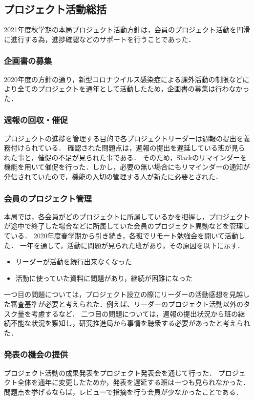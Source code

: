 \subsection*{プロジェクト活動総括}


2021年度秋学期の本局プロジェクト活動方針は，会員のプロジェクト活動を円滑に進行する為，進捗確認などのサポートを行うことであった．

\subsubsection*{企画書の募集}

2020年度の方針の通り，新型コロナウイルス感染症による課外活動の制限などにより全てのプロジェクトを通年として活動したため，企画書の募集は行わなかった．

\subsubsection*{週報の回収・催促}

プロジェクトの進捗を管理する目的で各プロジェクトリーダーは週報の提出を義務付けられている．
確認された問題点は，週報の提出を遅延している班が見られた事と，催促の不足が見られた事である．
そのため，Slackのリマインダーを機能を用いて催促を行った．しかし，必要の無い場合にもリマインダーの通知が発信されていたので，機能の入切の管理する人が新たに必要とされた．

\subsubsection*{会員のプロジェクト管理}

本局では，各会員がどのプロジェクトに所属しているかを把握し，プロジェクトが途中で終了した場合などに所属していた会員のプロジェクト異動などを管理している．
2020年度春学期から引き続き，各班でリモート勉強会を開いて活動した．
一年を通して，活動に問題が見られた班があり，その原因を以下に示す．
\begin{itemize}
\item リーダーが活動を続行出来なくなった
\item 活動に使っていた資料に問題があり，継続が困難になった
\end{itemize}
一つ目の問題については，プロジェクト設立の際にリーダーの活動感想を見越した審査基準が必要と考えられた．例えば、リーダーのプロジェクト活動以外のタスク量を考慮するなど．
二つ目の問題については，週報の提出状況から班の継続不能な状況を察知し，研究推進局から事情を聴衆する必要があったと考えられた．

\subsubsection*{発表の機会の提供}
プロジェクト活動の成果発表をプロジェクト発表会を通じて行った．
プロジェクト全体を通年に変更したためか，発表を遅延する班は一つも見られなかった．
問題点を挙げるならば，レビューで指摘を行う会員が少なかったことである．